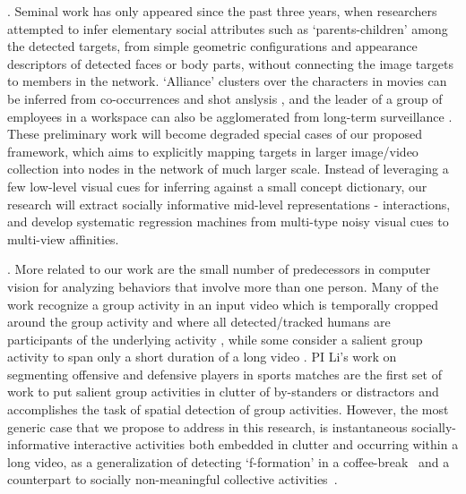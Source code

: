 . Seminal work has only appeared since the past three years, when researchers attempted to infer elementary social attributes such as `parents-children' among the detected targets, from simple geometric configurations and appearance descriptors of detected faces or body parts\cite{Gallagher,Wang2010,Murillo2012}, without connecting the image targets to members in the network. `Alliance' clusters over the characters in movies can be inferred from co-occurrences and shot anslysis \cite{Ding2010,Ding2011}, and the leader of a group of employees in a workspace can also be agglomerated from long-term surveillance \cite{Yu2009,Zhang2011}. These preliminary work will become degraded special cases of our proposed framework, which aims to explicitly mapping targets in larger image/video collection into nodes in the network of much larger scale. Instead of leveraging a few low-level visual cues for inferring against a small concept dictionary, our research will extract socially informative mid-level representations - interactions, and develop systematic regression machines from multi-type noisy visual cues to multi-view affinities.


. More related to our work are the small number of predecessors in computer vision for analyzing behaviors that involve more than one person. Many of the work recognize a group activity in an input video which is temporally cropped around the group activity and where all detected/tracked humans are participants of the underlying activity \cite{Intille:act,Ni:group,Lan:Group}, while some consider a salient group activity to span only a short duration of a long video \cite{Hongeng:act,Gong:act,Hakeem:act,Ba:meeting,McCowan:meeting,Choi:recogtrack,Vlad:group, Ryoo:group}. PI Li's work on segmenting offensive and defensive players in sports matches \cite{LiIJCV2012,Li2010} are the first set of work to put salient group activities in clutter of by-standers or distractors and accomplishes the task of spatial detection of group activities. However, the most generic case that we propose to address in this research, is instantaneous socially-informative interactive activities both embedded in clutter and occurring within a long video, as a generalization of detecting `f-formation' in a coffee-break~\cite{Cristani:fformation} and a counterpart to socially non-meaningful collective activities~\cite{Amer:group}.


